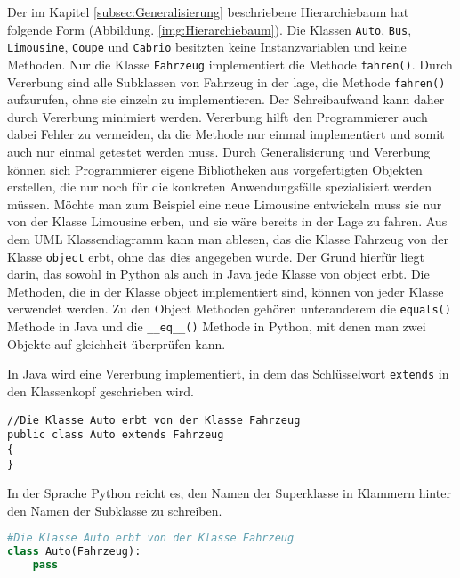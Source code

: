 Der im Kapitel \ref{subsec:Generalisierung} beschriebene Hierarchiebaum hat folgende Form (Abbildung. \ref{img:Hierarchiebaum}). Die Klassen \texttt{Auto}, \texttt{Bus}, \texttt{Limousine}, \texttt{Coupe} und \texttt{Cabrio} besitzten keine Instanzvariablen und keine Methoden. Nur die Klasse \texttt{Fahrzeug} implementiert die Methode \texttt{fahren()}.
Durch Vererbung sind alle Subklassen von Fahrzeug in der lage, die Methode \texttt{fahren()} aufzurufen, ohne sie einzeln zu implementieren. Der Schreibaufwand kann daher durch Vererbung minimiert werden. Vererbung hilft den Programmierer auch dabei Fehler zu vermeiden, da die Methode nur einmal implementiert und somit auch nur einmal getestet werden muss. Durch Generalisierung und Vererbung können sich Programmierer eigene Bibliotheken aus vorgefertigten Objekten  erstellen, die nur noch für die konkreten Anwendungsfälle spezialisiert werden müssen. Möchte man zum Beispiel eine neue Limousine entwickeln muss sie nur von der Klasse Limousine erben, und sie wäre bereits in der Lage zu fahren. Aus dem UML Klassendiagramm kann man ablesen, das die Klasse Fahrzeug von der Klasse \texttt{object} erbt, ohne das dies angegeben wurde. Der Grund hierfür liegt darin, das sowohl in Python als auch in Java jede Klasse von object erbt. Die Methoden, die in der Klasse object implementiert sind, können von jeder Klasse verwendet werden. Zu den Object Methoden gehören unteranderem die \texttt{equals()} Methode in Java und die \texttt{\_\_eq\_\_()} Methode in Python, mit denen man zwei Objekte auf gleichheit überprüfen kann. 

In Java wird eine Vererbung implementiert, in dem das Schlüsselwort \texttt{extends} in den Klassenkopf geschrieben wird.

\begin{lstlisting}[caption=Vererbung in Java, label=Vererbung Java]
//Die Klasse Auto erbt von der Klasse Fahrzeug
public class Auto extends Fahrzeug   
{ 
}
\end{lstlisting}

In der Sprache Python reicht es, den Namen der Superklasse in Klammern hinter den Namen der Subklasse zu schreiben.

\begin{lstlisting}[caption= Vererbung in Python \footnote{Python lässt keine leeren Klassen zu, daher muss der befehl \texttt{pass} verwendet werden}, label=lst:Vererbungpython,language=Python]
#Die Klasse Auto erbt von der Klasse Fahrzeug    
class Auto(Fahrzeug):
    pass
\end{lstlisting}


